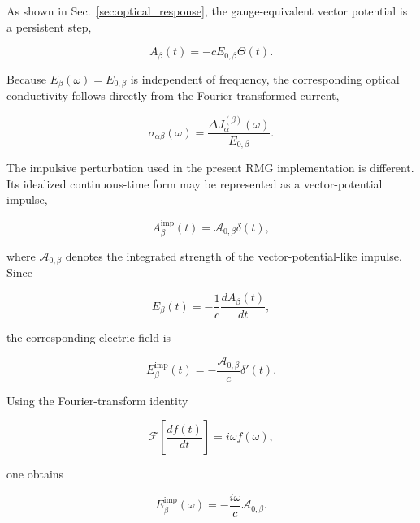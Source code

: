 As shown in Sec.~\ref{sec:optical_response}, the gauge-equivalent vector
potential is a persistent step,

\begin{equation}
A_{\beta}(t)
=
-cE_{0,\beta}\Theta(t).
\label{eq:standard_A_step}
\end{equation}

Because $E_{\beta}(\omega)=E_{0,\beta}$ is independent of frequency,
the corresponding optical conductivity follows directly from the
Fourier-transformed current,

\begin{equation}
\sigma_{\alpha\beta}(\omega)
=
\frac{\Delta J_{\alpha}^{(\beta)}(\omega)}
     {E_{0,\beta}}.
\label{eq:standard_vg_conductivity}
\end{equation}

The impulsive perturbation used in the present RMG implementation is
different.  Its idealized continuous-time form may be represented as a
vector-potential impulse,

\begin{equation}
A_{\beta}^{\mathrm{imp}}(t)
=
\mathcal{A}_{0,\beta}\delta(t),
\label{eq:A_delta_impulse}
\end{equation}

where $\mathcal{A}_{0,\beta}$ denotes the integrated strength of the
vector-potential-like impulse.  Since

\begin{equation}
E_{\beta}(t)
=
-\frac{1}{c}
\frac{dA_{\beta}(t)}{dt},
\label{eq:E_from_A_again}
\end{equation}

the corresponding electric field is

\begin{equation}
E_{\beta}^{\mathrm{imp}}(t)
=
-\frac{\mathcal{A}_{0,\beta}}{c}
\delta'(t).
\label{eq:E_delta_prime}
\end{equation}

Using the Fourier-transform identity

\begin{equation}
\mathcal{F}
\left[
\frac{df(t)}{dt}
\right]
=
i\omega f(\omega),
\label{eq:fft_derivative_repeated}
\end{equation}

one obtains

\begin{equation}
E_{\beta}^{\mathrm{imp}}(\omega)
=
-\frac{i\omega}{c}
\mathcal{A}_{0,\beta}.
\label{eq:E_impulse_frequency}
\end{equation}

